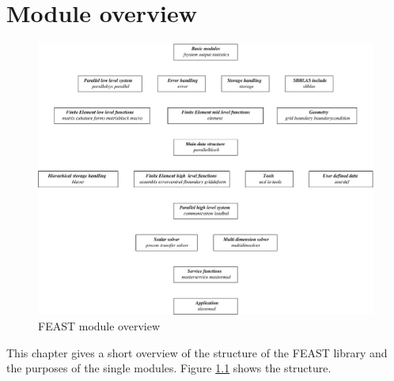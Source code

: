\chapter{Module overview}

\newpage

\begin{figure}[!h]
\begin{center}
\includegraphics[scale=0.675]{../psfiles/modoverview.eps}
\end{center}
\caption{FEAST module overview}
\label{modoverview}
\end{figure}

This chapter gives a short overview of the structure of the
FEAST library and the purposes of the single modules. Figure \ref{modoverview}
shows the structure.

